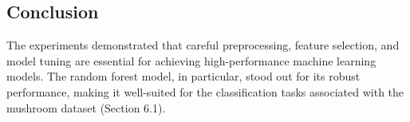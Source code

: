 \documentclass{article}
\begin{document}
\subsection{Conclusion}

The experiments demonstrated that careful preprocessing, feature selection, and model tuning are essential for achieving high-performance machine learning models. The random forest model, in particular, stood out for its robust performance, making it well-suited for the classification tasks associated with the mushroom dataset (Section 6.1).
\end{document}
